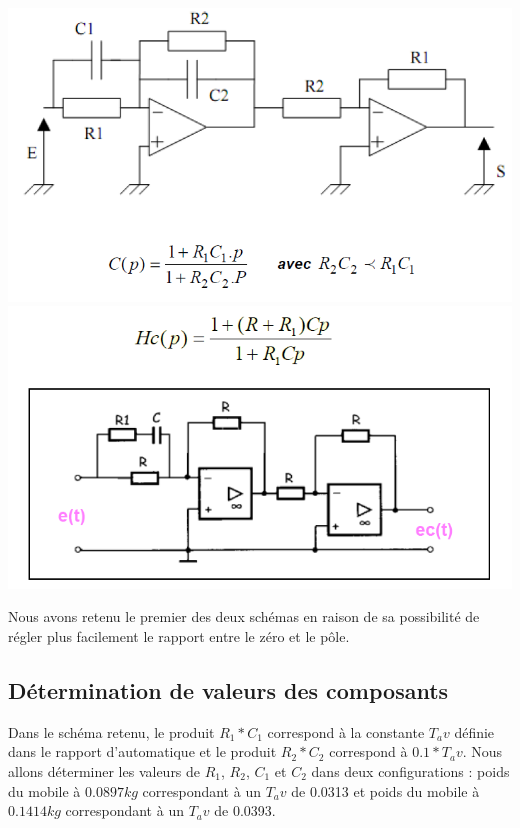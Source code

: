 \documentclass[11pt, french]{article} %
\begin{document}
\begin{center}
\includegraphics[scale = 0.8]{SolutionAnalogique/Avph.png} 
\includegraphics[scale = 0.8]{SolutionAnalogique/Avph2.png}
\end{center}

Nous avons retenu le premier des deux schémas en raison de sa possibilité de régler plus facilement le rapport entre le zéro et le pôle. 


\subsection{Détermination de valeurs des composants}

Dans le schéma retenu, le produit $R_1*C_1$ correspond à la constante $ T_av$ définie dans le rapport d'automatique et le produit $R_2*C_2$ correspond à $0.1*T_av$. Nous allons déterminer les valeurs de $R_1$, $R_2$, $C_1$ et $C_2$ dans deux configurations : poids du mobile à $0.0897 kg$ correspondant à un $T_av$ de 0.0313 et poids du mobile à $0.1414 kg$ correspondant à un $T_av$ de 0.0393.

\vspace{0.5cm}
\end{document}

